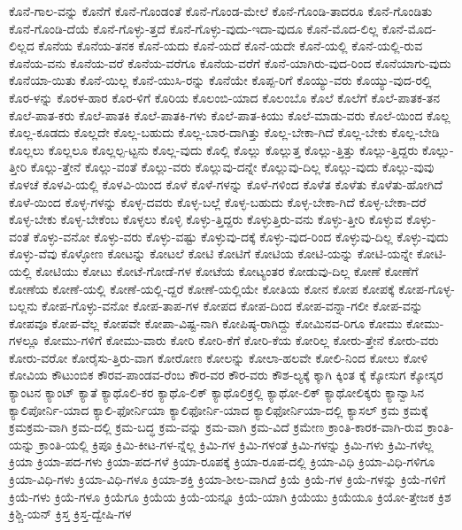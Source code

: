 {ಕೊನೆ-ಗಾಲ-ವನ್ನು
ಕೊನೆಗೆ
ಕೊನೆ-ಗೊಂಡಂತೆ
ಕೊನೆ-ಗೊಂಡ-ಮೇಲೆ
ಕೊನೆ-ಗೊಂಡಿ-ತಾದರೂ
ಕೊನೆ-ಗೊಂಡಿತು
ಕೊನೆ-ಗೊಂಡಿ-ದೆಯೆ
ಕೊನೆ-ಗೊಳ್ಳು-ತ್ತದೆ
ಕೊನೆ-ಗೊಳ್ಳು-ವುದು-ಇದಾ-ವುದೂ
ಕೊನೆ-ಮೊದ-ಲಿಲ್ಲ
ಕೊನೆ-ಮೊದ-ಲಿಲ್ಲದ
ಕೊನೆಯ
ಕೊನೆಯ-ತನಕ
ಕೊನೆ-ಯದು
ಕೊನೆ-ಯದೆ
ಕೊನೆ-ಯದೇ
ಕೊನೆ-ಯಲ್ಲಿ
ಕೊನೆ-ಯಲ್ಲಿ-ರುವ
ಕೊನೆಯ-ವನು
ಕೊನೆಯ-ವರೆ
ಕೊನೆಯ-ವರೆಗೂ
ಕೊನೆಯ-ವರೆಗೆ
ಕೊನೆ-ಯಾಗಿರು-ವುದ-ರಿಂದ
ಕೊನೆಯಾಗು-ವುದು
ಕೊನೆಯಾ-ಯಿತು
ಕೊನೆ-ಯಿಲ್ಲ
ಕೊನೆ-ಯುಸಿ-ರನ್ನು
ಕೊನೆಯೇ
ಕೊಪ್ಪ-ರಿಗೆ
ಕೊಯ್ಯು-ವರು
ಕೊಯ್ಯು-ವುದ-ರಲ್ಲಿ
ಕೊರ-ಳನ್ನು
ಕೊರಳ-ಹಾರ
ಕೊರ-ಳಿಗೆ
ಕೊರಿಯ
ಕೊಲಂಬಿ-ಯಾದ
ಕೊಲಂಬೊ
ಕೊಲೆ
ಕೊಲೆಗೆ
ಕೊಲೆ-ಪಾತಕ-ತನ
ಕೊಲೆ-ಪಾತ-ಕರು
ಕೊಲೆ-ಪಾತಕಿ
ಕೊಲೆ-ಪಾತಕಿ-ಗಳು
ಕೊಲೆ-ಪಾತ-ಕಿಯು
ಕೊಲೆ-ಮಾಡು-ವರು
ಕೊಲೆ-ಯಿಂದ
ಕೊಲ್ಲ
ಕೊಲ್ಲ-ಕೂಡದು
ಕೊಲ್ಲದೇ
ಕೊಲ್ಲ-ಬಹುದು
ಕೊಲ್ಲ-ಬಾರ-ದಾಗಿತ್ತು
ಕೊಲ್ಲ-ಬೇಕಾ-ಗಿದೆ
ಕೊಲ್ಲ-ಬೇಕು
ಕೊಲ್ಲ-ಬೇಡಿ
ಕೊಲ್ಲಲು
ಕೊಲ್ಲಲೂ
ಕೊಲ್ಲಲ್ಪ-ಟ್ಟನು
ಕೊಲ್ಲ-ವುದು
ಕೊಲ್ಲಿ
ಕೊಲ್ಲು
ಕೊಲ್ಲುತ್ತ
ಕೊಲ್ಲು-ತ್ತಿತ್ತು
ಕೊಲ್ಲು-ತ್ತಿದ್ದರು
ಕೊಲ್ಲು-ತ್ತೀರಿ
ಕೊಲ್ಲು-ತ್ತೇನೆ
ಕೊಲ್ಲು-ವಂತೆ
ಕೊಲ್ಲು-ವರು
ಕೊಲ್ಲುವು-ದನ್ನೇ
ಕೊಲ್ಲುವು-ದಿಲ್ಲ
ಕೊಲ್ಲು-ವುದು
ಕೊಲ್ಲು-ವುವು
ಕೊಳಚೆ
ಕೊಳವಿ-ಯಲ್ಲಿ
ಕೊಳವಿ-ಯಿಂದ
ಕೊಳೆ
ಕೊಳೆ-ಗಳನ್ನು
ಕೊಳೆ-ಗಳಿಂದ
ಕೊಳೆತ
ಕೊಳೆತು
ಕೊಳೆತು-ಹೋಗಿದೆ
ಕೊಳೆ-ಯಿಂದ
ಕೊಳ್ಳ-ಗಳನ್ನು
ಕೊಳ್ಳ-ದವರು
ಕೊಳ್ಳ-ಬಲ್ಲೆ
ಕೊಳ್ಳ-ಬಹುದು
ಕೊಳ್ಳ-ಬೇಕಾ-ಗಿದೆ
ಕೊಳ್ಳ-ಬೇಕಾ-ದರೆ
ಕೊಳ್ಳ-ಬೇಕು
ಕೊಳ್ಳ-ಬೇಕೆಂಬ
ಕೊಳ್ಳಲು
ಕೊಳ್ಳಿ
ಕೊಳ್ಳು-ತ್ತಿದ್ದರು
ಕೊಳ್ಳುತ್ತಿರು-ವನು
ಕೊಳ್ಳು-ತ್ತೀರಿ
ಕೊಳ್ಳುವ
ಕೊಳ್ಳು-ವಂತೆ
ಕೊಳ್ಳು-ವನೋ
ಕೊಳ್ಳು-ವರು
ಕೊಳ್ಳು-ವಷ್ಟು
ಕೊಳ್ಳುವು-ದಕ್ಕೆ
ಕೊಳ್ಳು-ವುದ-ರಿಂದ
ಕೊಳ್ಳುವು-ದಿಲ್ಲ
ಕೊಳ್ಳು-ವುದು
ಕೊಳ್ಳು-ವೆವು
ಕೊಳ್ಳೋಣ
ಕೋಟನ್ನು
ಕೋಟಲೆ
ಕೋಟಿ
ಕೋಟಿಗೆ
ಕೋಟಿಯ
ಕೋಟಿ-ಯನ್ನು
ಕೋಟಿ-ಯನ್ನೇ
ಕೋಟಿ-ಯಲ್ಲಿ
ಕೋಟಿಯು
ಕೋಟು
ಕೋಟೆ-ಗೋಡೆ-ಗಳ
ಕೋಟೆಯ
ಕೋಟ್ಯಂತರ
ಕೋಡುವು-ದಿಲ್ಲ
ಕೋಣೆ
ಕೋಣೆಗೆ
ಕೋಣೆಯ
ಕೋಣೆ-ಯಲ್ಲಿ
ಕೋಣೆ-ಯಲ್ಲಿ-ದ್ದರೆ
ಕೋಣೆ-ಯಲ್ಲಿಯೇ
ಕೋತಿಯ
ಕೋನ
ಕೋಪ
ಕೋಪಕ್ಕೆ
ಕೋಪ-ಗೊಳ್ಳ-ಬಲ್ಲನು
ಕೋಪ-ಗೊಳ್ಳು-ವನೋ
ಕೋಪ-ತಾಪ-ಗಳ
ಕೋಪದ
ಕೋಪ-ದಿಂದ
ಕೋಪ-ವನ್ನಾ-ಗಲೀ
ಕೋಪ-ವನ್ನು
ಕೋಪವೂ
ಕೋಪ-ವೆಲ್ಲ
ಕೋಪವೇ
ಕೋಪಾ-ವಿಷ್ಟ-ನಾಗಿ
ಕೋಪಿಷ್ಠ-ರಾಗಿದ್ದು
ಕೋಮಿನವ-ರಿಗೂ
ಕೋಮು
ಕೋಮು-ಗಳಲ್ಲೂ
ಕೋಮು-ಗಳಿಗೆ
ಕೋಮು-ವಾರು
ಕೋರಿ
ಕೋರಿ-ಕೆಗೆ
ಕೋರಿ-ಕೆಯ
ಕೋರಿಲ್ಲ
ಕೋರು-ತ್ತೇನೆ
ಕೋರು-ವರು
ಕೋರು-ವರೋ
ಕೋರೈಸು-ತ್ತಿರು-ವಾಗ
ಕೋರೋಣ
ಕೋಲನ್ನು
ಕೋಲಾ-ಹಲವೇ
ಕೋಲಿ-ನಿಂದ
ಕೋಲು
ಕೋಳಿ
ಕೋವಿಯ
ಕೌಟುಂಬಿಕ
ಕೌರವ-ಪಾಂಡವ-ರೆಂಬ
ಕೌರ-ವರ
ಕೌರ-ವರು
ಕೌಶ-ಲ್ಯಕ್ಕೆ
ಕ್ಕಾಗಿ
ಕ್ಕಿಂತ
ಕ್ಕೆ
ಕ್ಕೋಸುಗ
ಕ್ಕೋಸ್ಕರ
ಕ್ಯಾಂಟನ
ಕ್ಯಾಂಟ್
ಕ್ಯಾತೆ
ಕ್ಯಾಥೊಲಿ-ಕರ
ಕ್ಯಾಥೊ-ಲಿಕ್
ಕ್ಯಾಥೊಲಿಕ್ರಲ್ಲಿ
ಕ್ಯಾಥೋ-ಲಿಕ್
ಕ್ಯಾಥೋಲಿಕ್ಕರು
ಕ್ಯಾನ್ವಾಸಿನ
ಕ್ಯಾಲಿಪೋರ್ನಿ-ಯಾದ
ಕ್ಯಾಲಿ-ಫೋರ್ನಿಯಾ
ಕ್ಯಾಲಿಫೋರ್ನಿ-ಯಾದ
ಕ್ಯಾಲಿಫೋರ್ನಿಯಾ-ದಲ್ಲಿ
ಕ್ಯಾಸಲ್
ಕ್ರಮ
ಕ್ರಮಕ್ಕೆ
ಕ್ರಮಕ್ರಮ-ವಾಗಿ
ಕ್ರಮ-ದಲ್ಲಿ
ಕ್ರಮ-ಬದ್ಧ
ಕ್ರಮ-ವನ್ನು
ಕ್ರಮ-ವಾಗಿ
ಕ್ರಮ-ವಿದೆ
ಕ್ರಮೇಣ
ಕ್ರಾಂತಿ-ಕಾರಕ-ವಾಗಿ-ರುವ
ಕ್ರಾಂತಿ-ಯನ್ನು
ಕ್ರಾಂತಿ-ಯಲ್ಲಿ
ಕ್ರಿಪೂ
ಕ್ರಿಮಿ-ಕೀಟ-ಗಳ-ನ್ನೆಲ್ಲ
ಕ್ರಿಮಿ-ಗಳ
ಕ್ರಿಮಿ-ಗಳಂತೆ
ಕ್ರಿಮಿ-ಗಳನ್ನು
ಕ್ರಿಮಿ-ಗಳು
ಕ್ರಿಮಿ-ಗಳೆಲ್ಲ
ಕ್ರಿಯಾ
ಕ್ರಿಯಾ-ಪದ-ಗಳು
ಕ್ರಿಯಾ-ಪದ-ಗಳೆ
ಕ್ರಿಯಾ-ರೂಪಕ್ಕೆ
ಕ್ರಿಯಾ-ರೂಪ-ದಲ್ಲಿ
ಕ್ರಿಯಾ-ವಿಧಿ
ಕ್ರಿಯಾ-ವಿಧಿ-ಗಳಿಗೂ
ಕ್ರಿಯಾ-ವಿಧಿ-ಗಳು
ಕ್ರಿಯಾ-ವಿಧಿ-ಗಳೂ
ಕ್ರಿಯಾ-ಶಕ್ತಿ
ಕ್ರಿಯಾ-ಶೀಲ-ವಾಗಿದೆ
ಕ್ರಿಯೆ
ಕ್ರಿಯೆ-ಗಳ
ಕ್ರಿಯೆ-ಗಳನ್ನು
ಕ್ರಿಯೆ-ಗಳಿಗೆ
ಕ್ರಿಯೆ-ಗಳು
ಕ್ರಿಯೆ-ಗಳೂ
ಕ್ರಿಯೆಗೂ
ಕ್ರಿಯೆಯ
ಕ್ರಿಯೆ-ಯನ್ನೂ
ಕ್ರಿಯೆ-ಯಾಗಿ
ಕ್ರಿಯೆಯು
ಕ್ರಿಯೆಯೂ
ಕ್ರಿಯೋ-ತ್ತೇಜಕ
ಕ್ರಿಶ
ಕ್ರಿಶ್ಚಿ-ಯನ್
ಕ್ರಿಸ್ತ
ಕ್ರಿಸ್ತ-ದ್ವೇಷಿ-ಗಳ
}
